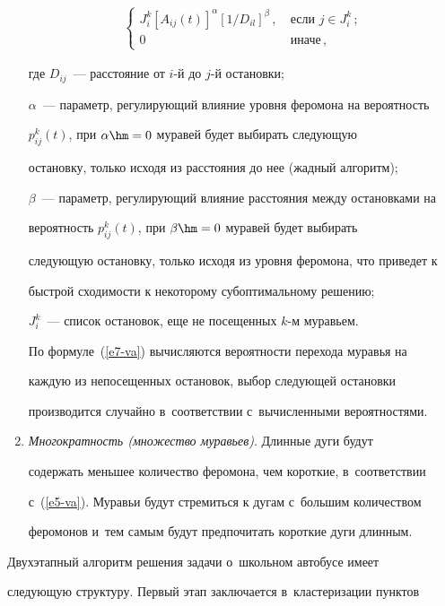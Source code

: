 \begin{multicols}{2}
\begin{enumerate}[1.]
\begin{multline}
\begin{cases}
{{J_i^k} [A_{ij}(t)]^\alpha [1/D_{il}]^\beta}\,, &\ \mbox{если } j\in J_i^k\,;\\

0 &\ \mbox{иначе}\,,

\end{cases}

\label{e7-va}

\end{multline}

где $D_{ij}$~--- расстояние от $i$-й до $j$-й остановки;

$\alpha$~--- параметр, регулирующий влияние уровня феромона на вероятность

$p_{ij}^k(t)$, при $\alpha \hm=0$ муравей будет выбирать следующую

остановку, только исходя из расстояния до нее (жадный алгоритм);

$\beta$~--- параметр, регулирующий влияние расстояния между остановками на

вероятность $p_{ij}^k(t)$, при $\beta\hm = 0$ муравей будет выбирать

следующую остановку, только исходя из уровня феромона, что приведет к

быст\-рой схо\-ди\-мости к некоторому субоптимальному решению;

$J_i^k$~--- список остановок, еще не посещенных $k$-м муравьем.



По формуле~(\ref{e7-va}) вычисляются вероятности перехода муравья на

каждую из непосещенных остановок, выбор следующей остановки

производится случайно в~соответствии с~вычисленными вероятностями.

\item \textit{Многократность (множество муравьев)}. Длинные дуги будут

содержать меньшее количество феромона, чем короткие, в~соответствии

с~(\ref{e5-va}). Муравьи будут стремиться к дугам с~большим количеством

феромонов и~тем самым будут предпочитать короткие дуги длинным.

\end{enumerate}



     Двухэтапный алгоритм решения задачи о~школьном автобусе имеет

следующую структуру. Первый этап заключается в~кластеризации пунктов


\end{multicols}
